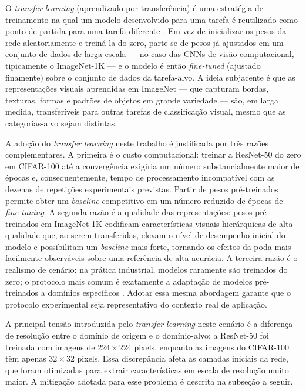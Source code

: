 O \textit{transfer learning} (aprendizado por transferência) é uma estratégia de treinamento na qual um modelo desenvolvido para uma tarefa é reutilizado como ponto de partida para uma tarefa diferente \cite{Goodfellow2016}. Em vez de inicializar os pesos da rede aleatoriamente e treiná-la do zero, parte-se de pesos já ajustados em um conjunto de dados de larga escala --- no caso das CNNs de visão computacional, tipicamente o ImageNet-1K --- e o modelo é então \textit{fine-tuned} (ajustado finamente) sobre o conjunto de dados da tarefa-alvo. A ideia subjacente é que as representações visuais aprendidas em ImageNet --- que capturam bordas, texturas, formas e padrões de objetos em grande variedade --- são, em larga medida, transferíveis para outras tarefas de classificação visual, mesmo que as categorias-alvo sejam distintas.

A adoção do \textit{transfer learning} neste trabalho é justificada por três razões complementares. A primeira é o custo computacional: treinar a ResNet-50 do zero em CIFAR-100 até a convergência exigiria um número substancialmente maior de épocas e, consequentemente, tempo de processamento incompatível com as dezenas de repetições experimentais previstas. Partir de pesos pré-treinados permite obter um \textit{baseline} competitivo em um número reduzido de épocas de \textit{fine-tuning}. A segunda razão é a qualidade das representações: pesos pré-treinados em ImageNet-1K codificam características visuais hierárquicas de alta qualidade que, ao serem transferidas, elevam o nível de desempenho inicial do modelo e possibilitam um \textit{baseline} mais forte, tornando os efeitos da poda mais facilmente observáveis sobre uma referência de alta acurácia. A terceira razão é o realismo de cenário: na prática industrial, modelos raramente são treinados do zero; o protocolo mais comum é exatamente a adaptação de modelos pré-treinados a domínios específicos \cite{Han2015, Li2017}. Adotar essa mesma abordagem garante que o protocolo experimental seja representativo do contexto real de aplicação.

A principal tensão introduzida pelo \textit{transfer learning} neste cenário é a diferença de resolução entre o domínio de origem e o domínio-alvo: a ResNet-50 foi treinada com imagens de $224 \times 224$ pixels, enquanto as imagens do CIFAR-100 têm apenas $32 \times 32$ pixels. Essa discrepância afeta as camadas iniciais da rede, que foram otimizadas para extrair características em escala de resolução muito maior. A mitigação adotada para esse problema é descrita na subseção a seguir.

